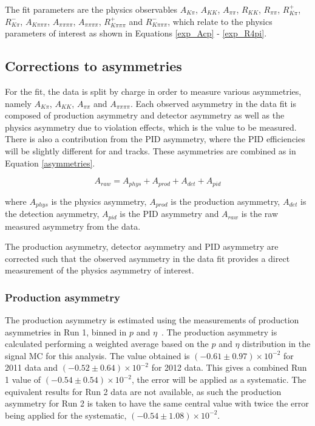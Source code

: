 The \CP fit parameters are the physics observables $A_{K\pi}$, $A_{KK}$, $A_{\pi\pi}$, $R_{KK}$, $R_{\pi\pi}$, $R^+_{K\pi}$, $R^-_{K\pi}$, $A_{K\pi\pi\pi}$, $A_{\pi\pi\pi\pi}$, $A_{\pi\pi\pi\pi}$, $R^+_{K\pi\pi\pi}$ and $R^-_{K\pi\pi\pi}$, which relate to the physics parameters of interest as shown in Equations \ref{exp_Acp} - \ref{exp_R4pi}.

\subsection{Corrections to asymmetries}
\label{sec:cpfit:asymmetries}

For the \CP fit, the data is split by charge in order to measure various asymmetries, namely $A_{K\pi}$, $A_{KK}$, $A_{\pi\pi}$ and $A_{\pi\pi\pi\pi}$. Each observed asymmetry in the data fit is composed of \Bpm production asymmetry and detector asymmetry as well as the physics asymmetry due to \CP violation effects, which is the value to be measured. There is also a contribution from the PID asymmetry, where the PID efficiencies will be slightly different for \Bp and \Bm tracks. These asymmetries are combined as in Equation \ref{asymmetries}.

\begin{equation}
A_{raw} = A_{phys} + A_{prod} + A_{det} + A_{pid}
\label{asymmetries}
\end{equation} 

where $A_{phys}$ is the physics \CP asymmetry, $A_{prod}$ is the production asymmetry, $A_{det}$ is the detection asymmetry, $A_{pid}$ is the PID asymmetry and $A_{raw}$ is the raw measured asymmetry from the data.

The production asymmetry, detector asymmetry and PID asymmetry are corrected such that the observed asymmetry in the data fit provides a direct measurement of the physics asymmetry of interest.

\subsubsection{Production asymmetry}

The \Bpm production asymmetry is estimated using the measurements of production asymmetries in Run 1, binned in $p$ and $\eta$~\cite{LHCb-PAPER-2016-054}. The production asymmetry is calculated performing a weighted average based on the $p$ and $\eta$ distribution in the signal MC for this analysis. The value obtained is $(-0.61 \pm 0.97) \times 10^{-2}$ for 2011 data and $(-0.52 \pm 0.64) \times 10^{-2}$ for 2012 data. This gives a combined Run 1 value of $(-0.54 \pm 0.54) \times 10^{-2}$, the error will be applied as a systematic. The equivalent results for Run 2 data are not available, as such the production asymmetry for Run 2 is taken to have the same central value with twice the error being applied for the systematic, $(-0.54 \pm 1.08) \times 10^{-2}$.

